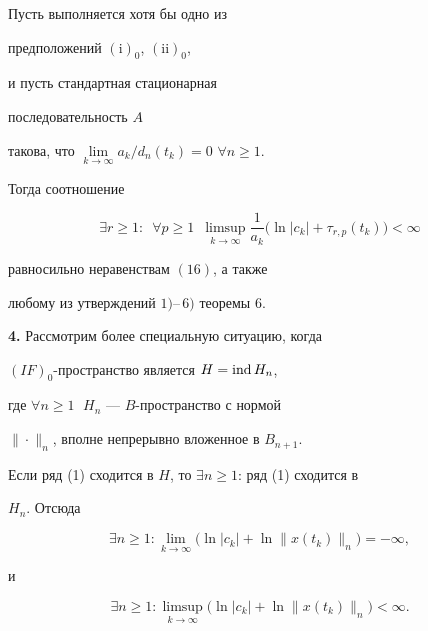 \begin{thm}


Пусть выполняется хотя бы одно из


предположений $(\mathrm i)_0$, $(\mathrm{ii})_0$,


и пусть стандартная стационарная


последовательность $A$


такова, что $\lim\limits_{k\to\infty}a_k/d_n(t_k)=0$ $\forall n\geqslant 1$.


Тогда соотношение


$$


\exists r\geqslant 1:\ \; \forall p\geqslant 1 \ \;


\limsup\limits_{k\to\infty}\dfrac{1}{a_k}


\bigl(\ln|c_k|+\tau_{r,p}(t_k)\bigr)<\infty


$$


равносильно неравенствам $(16)$, а также


любому из утверждений $1)$--\,$6)$ теоремы $6$.


\end{thm}





{\bf 4.} Рассмотрим более специальную ситуацию, когда


$(IF)_0$-пространство является $H=\ind H_n$,


где $\forall n\geqslant 1\;$ $H_n$ --- $B$-пространство с нормой


$\|\cdot\|_n$, вполне непрерывно вложенное в $B_{n+1}$.





Если ряд (1) сходится в $H$, то $\exists n\geqslant 1$: ряд (1) сходится в


$H_n$. Отсюда


\begin{equation}


\exists n\geqslant 1:\lim\limits_{k\to\infty}


\bigl(\ln|c_k|+\ln\|x(t_k)\|_n\bigr)=-\infty,


\end{equation}


и


\begin{equation}


\exists n\geqslant 1:\limsup\limits_{k\to\infty}


\bigl(\ln|c_k|+\ln\|x(t_k)\|_n\bigr)<\infty.


\end{equation}





